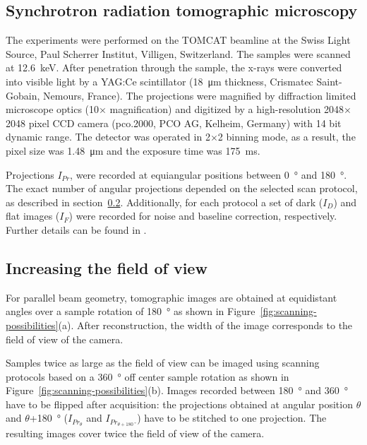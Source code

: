\documentclass[preprint,s]{iucr}
\begin{document}
\subsection{Synchrotron radiation tomographic microscopy}
The experiments were performed on the TOMCAT beamline at the Swiss Light Source, Paul Scherrer Institut, Villigen, Switzerland. The samples were scanned at \SI{12.6}{\kilo\electronvolt}. After penetration through the sample, the x-rays were converted into visible light by a YAG:Ce scintillator (\SI{18}{\micro\meter} thickness, Crismatec Saint-Gobain, Nemours, France). The projections were magnified by diffraction limited microscope optics (10$\times$ magnification) and digitized by a high-resolution 2048$\times$2048 pixel CCD camera (pco.2000, PCO AG, Kelheim, Germany) with 14 bit dynamic range. The detector was operated in 2$\times$2 binning mode, as a result, the pixel size was \SI{1.48}{\micro\meter} and the exposure time was \SI{175}{\milli\second}.

Projections $I_{Pr}$, were recorded at equiangular positions between \SI{0}{\degree} and \SI{180}{\degree}. The exact number of angular projections depended on the selected scan protocol, as described in section~\ref{subsec:increasing the field of view}. Additionally, for each protocol a set of dark ($I_{D}$) and flat images ($I_{F}$) were recorded for noise and baseline correction, respectively. Further details can be found in .

\subsection{Increasing the field of view}\label{subsec:increasing the field of view}
For parallel beam geometry, tomographic images are obtained at equidistant angles over a sample rotation of \SI{180}{\degree} as shown in Figure~\ref{fig:scanning-possibilities}(a). After reconstruction, the width of the image corresponds to the field of view of the camera.

Samples twice as large as the field of view can be imaged using scanning protocols based on a \SI{360}{\degree} off center sample rotation as shown in Figure~\ref{fig:scanning-possibilities}(b). Images recorded between \SI{180}{\degree} and \SI{360}{\degree} have to be flipped after acquisition: the projections obtained at angular position $\theta$ and $\theta$+\SI{180}{\degree} ($I_{Pr_{\theta}}$ and $I_{Pr_{\theta+\SI{180}{\degree}}}$) have to be stitched to one projection. The resulting images cover twice the field of view of the camera.
\end{document}
